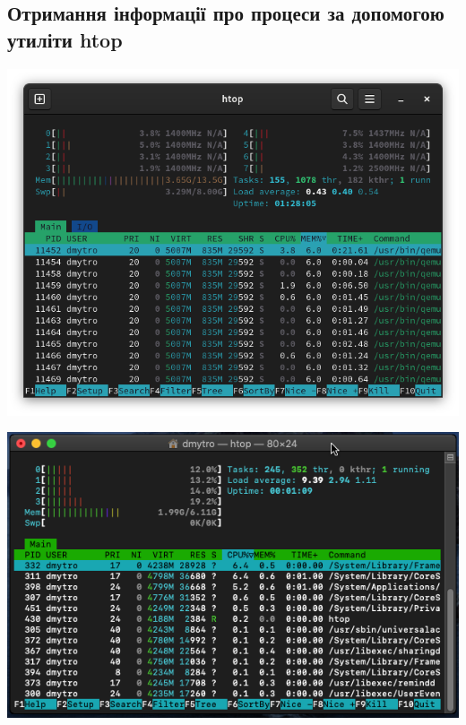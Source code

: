 \documentclass{article}
\begin{document}
\begin{normalsize}
	\section*{Отримання інформації про процеси за допомогою утиліти htop}
	\begin{center}
		\includegraphics[scale=0.5]{htop1}
	\end{center}
	\begin{center}
		\includegraphics[scale=0.5]{htop2}
	\end{center}

\end{normalsize}
\end{document}
